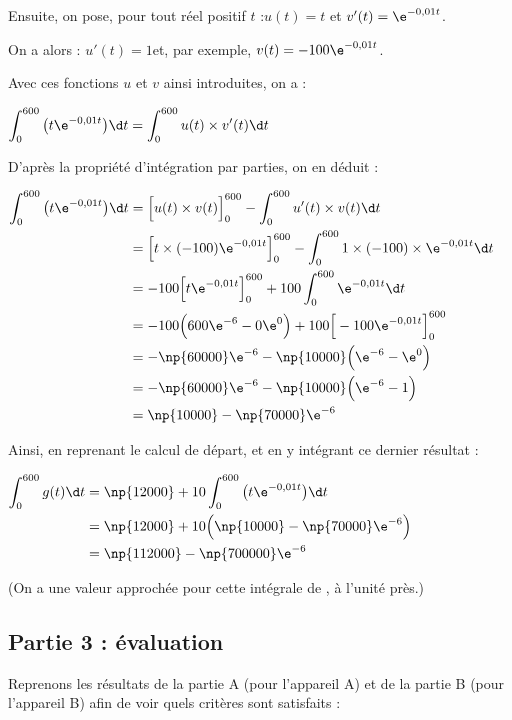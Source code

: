 \begin{enumerate}
Ensuite, on pose, pour tout réel positif $t$ :\quad $u(t) = t$ \quad et \quad $v'(t) = \e^{-0,01t}$.

On a alors : \quad $u'(t) = 1$\quad et, par exemple, \quad $v(t) = -100\e^{-0,01t}$.

Avec ces fonctions $u$ et $v$ ainsi introduites, on a :

$\displaystyle \int_{0}^{600} \big(t\e^{-0,01t}\big) \d t = \int_{0}^{600} u(t)\times v'(t) \d t$

D'après la propriété d'intégration par parties, on en déduit :

	$\begin{aligned}[t] \displaystyle \int_{0}^{600} \big(t\e^{-0,01t}\big) \d t
	&= \Big[u(t)\times v(t) \Big]_0^{600} - \int_{0}^{600} u'(t)\times v(t) \d t\\
	&= \Big[t\times (-100)\e^{-0,01t} \Big]_0^{600} - \int_{0}^{600} 1\times( -100)\times \e^{-0,01t} \d t\\
	&= -100 \Big[t\e^{-0,01t} \Big]_0^{600} +100 \int_{0}^{600} \e^{-0,01t} \d t\\
	&= -100 \Big(600\e^{-6} - 0\e^{0}\Big) + 100 \Big[-100\e^{-0,01t}\Big]_{0}^{600}\\
	&= -\np{60000}\e^{-6} - \np{10000} \Big(\e^{-6} - \e^{0}\Big)\\
	&= -\np{60000}\e^{-6} - \np{10000} \Big(\e^{-6} - 1\Big)\\
	&= \np{10000}-\np{70000}\e^{-6}\\
	\end{aligned}$

Ainsi, en reprenant le calcul de départ, et en y intégrant ce dernier résultat :

$\begin{aligned}[t] \displaystyle \int_{0}^{600} g(t) \d t
&= \np{12000} + 10 \int_{0}^{600} \big(t\e^{-0,01t}\big) \d t\\
&= \np{12000} + 10\Big(\np{10000}-\np{70000}\e^{-6}\Big)\\
&=\np{112000} - \np{700000}\e^{-6}	\end{aligned}$

(On a une valeur approchée pour cette intégrale de , à l'unité près.)
\end{enumerate}

\subsection*{Partie 3 : évaluation}

Reprenons les résultats de la partie A (pour l'appareil A) et de la partie B (pour l'appareil B) afin de voir quels critères sont satisfaits :

